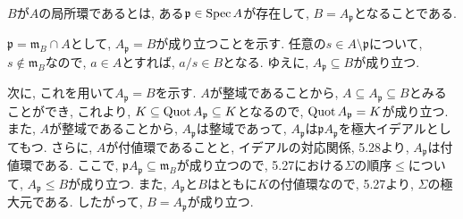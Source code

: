 \documentclass[dvipdfmx]{jsarticle}
\begin{document}
    \begin{definition}
        $B$が$A$の局所環であるとは, ある$\mathfrak{p} \in \operatorname{Spec}{A}$が存在して,
        $B = A_\mathfrak{p}$となることである.
    \end{definition}

    \begin{problem}
        $\mathfrak{p} = \mathfrak{m}_B \cap A$として, $A_\mathfrak{p} = B$が成り立つことを示す.
        任意の$s \in A \setminus \mathfrak{p}$について, $s \notin \mathfrak{m}_B$なので,
        $a \in A$とすれば, $a/s \in B$となる.
        ゆえに, $A_\mathfrak{p} \subseteq B$が成り立つ.

        次に, これを用いて$A_\mathfrak{p} = B$を示す.
        $A$が整域であることから, $A \subseteq A_\mathfrak{p} \subseteq B$とみることができ,
        これより,
        $K \subseteq \operatorname{Quot}{A_\mathfrak{p}} \subseteq K$となるので,
        $\operatorname{Quot}{A_\mathfrak{p}} = K$が成り立つ.
        また, $A$が整域であることから,
        $A_\mathfrak{p}$は整域であって,
        $A_\mathfrak{p}$は$\mathfrak{p}A_\mathfrak{p}$を極大イデアルとしてもつ.
        さらに, $A$が付値環であることと, イデアルの対応関係,
        5.28より, $A_\mathfrak{p}$は付値環である.
        ここで, $\mathfrak{p}A_\mathfrak{p} \subseteq  \mathfrak{m}_B$が成り立つので,
        5.27における$\Sigma$の順序$\leq$について,
        $A_\mathfrak{p} \leq B$が成り立つ.
        また, $A_\mathfrak{p}$と$B$はともに$K$の付値環なので, 5.27より,
        $\Sigma$の極大元である.
        したがって, $B = A_\mathfrak{p}$が成り立つ.
    \end{problem}
\end{document}
